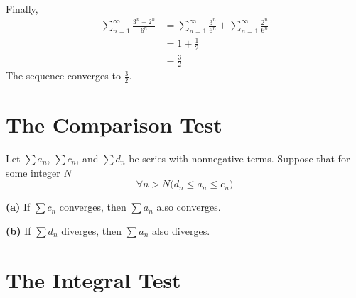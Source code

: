 \begin{ex}
\begin{sol}
\begin{figure}[H]
\begin{center}
{        }
      \end{center}
    \end{figure}

    Finally,
    \begin{align*}
      \sum_{n=1}^{\infty} \frac{3^n+2^n}{6^n}&=\sum_{n=1}^\infty
      \frac{3^n}{6^n} + \sum_{n=1}^\infty
      \frac{2^n}{6^n} \\
      &=1+\frac{1}{2} \\
      &= \frac{3}{2}
    \end{align*}
    The sequence converges to $\frac{3}{2}$.
    \end{sol}
\end{ex}

\section{The Comparison Test}
\begin{theorem}\label{th:seriescomp}
  Let $\sum a_n$, $\sum c_n$, and $\sum d_n$ be series with nonnegative terms.
  Suppose that for some integer $N$
  \[ \forall n > N \bigg(d_n \leq a_n \leq c_n\bigg) \]

  \textbf{(a)} If $\sum c_n$ converges, then $\sum a_n$ also converges.

  \textbf{(b)} If $\sum d_n$ diverges, then $\sum a_n$ also diverges.
\end{theorem}
\cite[p. 559]{thomas}

\section{The Integral Test}

